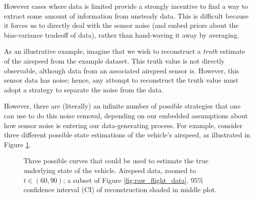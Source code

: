 However cases where data is limited provide a strongly incentive to find a way to extract some amount of information from unsteady data. This is difficult because it forces us to directly deal with the sensor noise (and embed priors about the bias-variance tradeoff of data), rather than hand-waving it away by averaging.

As an illustrative example, imagine that we wish to reconstruct a \emph{truth} estimate of the airspeed from the example dataset. This truth value is not directly observable, although data from an associated airspeed sensor is. However, this sensor data has noise; hence, any attempt to reconstruct the truth value must adopt a strategy to separate the noise from the data.

However, there are (literally) an infinite number of possible strategies that one can use to do this noise removal, depending on our embedded assumptions about how sensor noise is entering our data-generating process. For example, consider three different possible state estimations of the vehicle's airspeed, as illustrated in Figure \ref{fig:under_over_fitting}.

\begin{figure}[h]
    \centering
    \caption{Three possible curves that could be used to estimate the true underlying state of the vehicle. Airspeed data, zoomed to $t \in (60, 90)$; a subset of Figure \ref{fig:raw_flight_data}. 95\% confidence interval (CI) of reconstruction shaded in middle plot.}
    \label{fig:under_over_fitting}
\end{figure}

